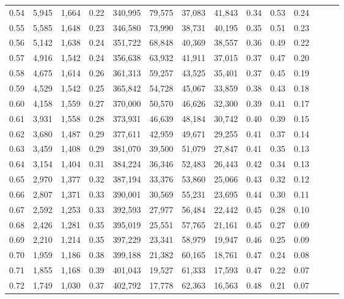 \begin{tabular}{rrrrrrrrrrrrrr}
0.54 &  5,945 &  1,664 &  0.22 &  340,995 &   79,575 &  37,083 &  41,843 &  0.34 &  0.53 &      0.24 \\
0.55 &  5,585 &  1,648 &  0.23 &  346,580 &   73,990 &  38,731 &  40,195 &  0.35 &  0.51 &      0.23 \\
0.56 &  5,142 &  1,638 &  0.24 &  351,722 &   68,848 &  40,369 &  38,557 &  0.36 &  0.49 &      0.22 \\
0.57 &  4,916 &  1,542 &  0.24 &  356,638 &   63,932 &  41,911 &  37,015 &  0.37 &  0.47 &      0.20 \\
0.58 &  4,675 &  1,614 &  0.26 &  361,313 &   59,257 &  43,525 &  35,401 &  0.37 &  0.45 &      0.19 \\
0.59 &  4,529 &  1,542 &  0.25 &  365,842 &   54,728 &  45,067 &  33,859 &  0.38 &  0.43 &      0.18 \\
0.60 &  4,158 &  1,559 &  0.27 &  370,000 &   50,570 &  46,626 &  32,300 &  0.39 &  0.41 &      0.17 \\
0.61 &  3,931 &  1,558 &  0.28 &  373,931 &   46,639 &  48,184 &  30,742 &  0.40 &  0.39 &      0.15 \\
0.62 &  3,680 &  1,487 &  0.29 &  377,611 &   42,959 &  49,671 &  29,255 &  0.41 &  0.37 &      0.14 \\
0.63 &  3,459 &  1,408 &  0.29 &  381,070 &   39,500 &  51,079 &  27,847 &  0.41 &  0.35 &      0.13 \\
0.64 &  3,154 &  1,404 &  0.31 &  384,224 &   36,346 &  52,483 &  26,443 &  0.42 &  0.34 &      0.13 \\
0.65 &  2,970 &  1,377 &  0.32 &  387,194 &   33,376 &  53,860 &  25,066 &  0.43 &  0.32 &      0.12 \\
0.66 &  2,807 &  1,371 &  0.33 &  390,001 &   30,569 &  55,231 &  23,695 &  0.44 &  0.30 &      0.11 \\
0.67 &  2,592 &  1,253 &  0.33 &  392,593 &   27,977 &  56,484 &  22,442 &  0.45 &  0.28 &      0.10 \\
0.68 &  2,426 &  1,281 &  0.35 &  395,019 &   25,551 &  57,765 &  21,161 &  0.45 &  0.27 &      0.09 \\
0.69 &  2,210 &  1,214 &  0.35 &  397,229 &   23,341 &  58,979 &  19,947 &  0.46 &  0.25 &      0.09 \\
0.70 &  1,959 &  1,186 &  0.38 &  399,188 &   21,382 &  60,165 &  18,761 &  0.47 &  0.24 &      0.08 \\
0.71 &  1,855 &  1,168 &  0.39 &  401,043 &   19,527 &  61,333 &  17,593 &  0.47 &  0.22 &      0.07 \\
0.72 &  1,749 &  1,030 &  0.37 &  402,792 &   17,778 &  62,363 &  16,563 &  0.48 &  0.21 &      0.07 \\

\end{tabular}

